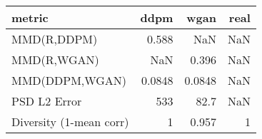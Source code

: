 \begin{tabular}{lrrr}
\toprule
metric & ddpm & wgan & real \\
\midrule
MMD(R,DDPM) & 0.588 & NaN & NaN \\
MMD(R,WGAN) & NaN & 0.396 & NaN \\
MMD(DDPM,WGAN) & 0.0848 & 0.0848 & NaN \\
PSD L2 Error & 533 & 82.7 & NaN \\
Diversity (1-mean corr) & 1 & 0.957 & 1 \\
\bottomrule
\end{tabular}
